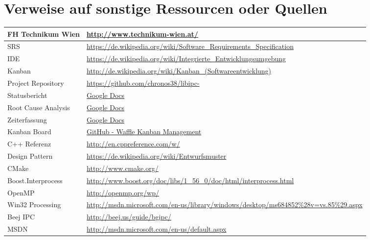 \documentclass[a4paper]{book}
\begin{document}
\section{Verweise auf sonstige Ressourcen oder Quellen}
\begin{center}
\begin{longtable}{|p{3cm}|p{8cm}|}
\hline
FH Technikum Wien & \url{http://www.technikum-wien.at/} \\
\hline
SRS & \url{https://de.wikipedia.org/wiki/Software_Requirements_Specification} \\
\hline
IDE & \url{https://de.wikipedia.org/wiki/Integrierte_Entwicklungsumgebung} \\
\hline
Kanban & \url{http://de.wikipedia.org/wiki/Kanban_(Softwareentwicklung)} \\
\hline
Project Repository & \url{https://github.com/chronos38/libipc-} \\
\hline
Statusbericht & \href{https://docs.google.com/document/d/12IZJyU6WJ3upd81pHYRQ8KWd34AJqNXi5WnBbJPOtIQ/edit?usp=sharing}{Google Docs} \\
\hline
Root Cause Analysis & \href{https://docs.google.com/document/d/16PQXzEqp1hANgkXX1qEbKkaIwQ57bTGZWJuKGO_t0wA/edit?usp=sharing}{Google Docs} \\
\hline
Zeiterfassung & \href{https://docs.google.com/spreadsheet/ccc?key=0AuApAQ4FqnCEdHdiWThZX2V5b1BsM2lWYWdWSzZNRVE&usp=sharing}{Google Docs} \\
\hline
Kanban Board & \href{https://waffle.io/chronos38/libipc-}{GitHub - Waffle Kanban Management} \\
\hline
C++ Referenz & \url{http://en.cppreference.com/w/} \\
\hline
Design Pattern & \url{https://de.wikipedia.org/wiki/Entwurfsmuster} \\
\hline
CMake & \url{http://www.cmake.org/} \\
\hline
Boost.Interprocess & \url{http://www.boost.org/doc/libs/1_56_0/doc/html/interprocess.html} \\
\hline
OpenMP & \url{http://openmp.org/wp/} \\
\hline
Win32 Processing & \url{http://msdn.microsoft.com/en-us/library/windows/desktop/ms684852\%28v=vs.85\%29.aspx} \\
\hline
Beej IPC & \url{http://beej.us/guide/bgipc/} \\
\hline
MSDN & \url{http://msdn.microsoft.com/en-us/default.aspx} \\
\hline 
\end{longtable}
\end{center}
\end{document}
